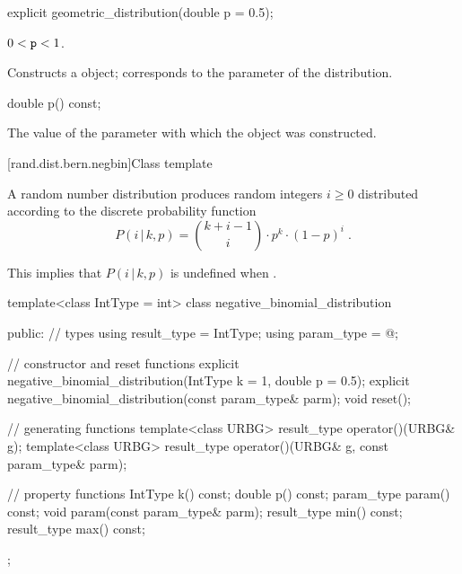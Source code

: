 %
\begin{itemdecl}
explicit geometric_distribution(double p = 0.5);
\end{itemdecl}

\begin{itemdescr}
\pnum\requires
 $0 < \texttt{p} < 1$.

\pnum\effects Constructs a  object;
 corresponds to the parameter of the distribution.
\end{itemdescr}

%
\begin{itemdecl}
double p() const;
\end{itemdecl}

\begin{itemdescr}
\pnum\returns The value of the  parameter
 with which the object was constructed.
\end{itemdescr}


[rand.dist.bern.negbin]{Class template }
%
%

\pnum
A  random number distribution
produces random integers $i \geq 0$
distributed according to
the discrete probability function
%
%
\[%
 P(i\,|\,k,p)
      = \binom{k+i-1}{i} \cdot p^k \cdot (1-p)^i
\; \mbox{.}
\]
\begin{note}
This implies that $P(i\,|\,k,p)$ is undefined when .
\end{note}

%
\begin{codeblock}
template<class IntType = int>
  class negative_binomial_distribution {
  public:
    // types
    using result_type = IntType;
    using param_type  = @\unspec@;

    // constructor and reset functions
    explicit negative_binomial_distribution(IntType k = 1, double p = 0.5);
    explicit negative_binomial_distribution(const param_type& parm);
    void reset();

    // generating functions
    template<class URBG>
      result_type operator()(URBG& g);
    template<class URBG>
      result_type operator()(URBG& g, const param_type& parm);

    // property functions
    IntType k() const;
    double p() const;
    param_type param() const;
    void param(const param_type& parm);
    result_type min() const;
    result_type max() const;
  };
\end{codeblock}


